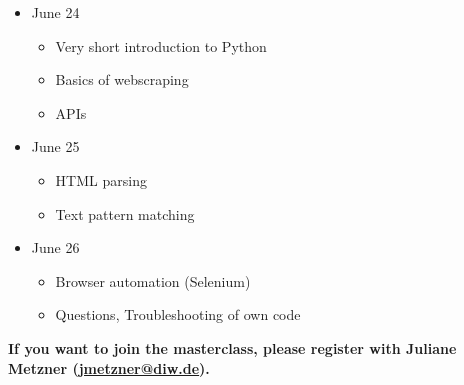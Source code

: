 \documentclass[a4paper]{article}
\begin{document}
\begin{itemize}
	\item June 24
		\begin{itemize}
			\item Very short introduction to Python
			\item Basics of webscraping
			\item APIs
		\end{itemize}
	\item June 25
		\begin{itemize}
			\item HTML parsing
			\item Text pattern matching
		\end{itemize}
	\item June 26
		\begin{itemize}
			\item Browser automation (Selenium)
			\item Questions, Troubleshooting of own code
		\end{itemize}
\end{itemize}

\textbf{If you want to join the masterclass, please register with
  Juliane Metzner (\href{mailto:jmetzner@diw.de}{jmetzner@diw.de}).}
\end{document}
